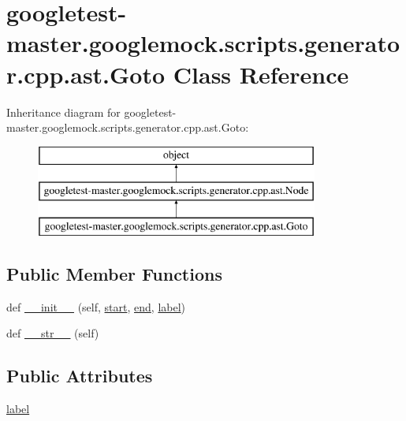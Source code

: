 \hypertarget{classgoogletest-master_1_1googlemock_1_1scripts_1_1generator_1_1cpp_1_1ast_1_1_goto}{}\section{googletest-\/master.googlemock.\+scripts.\+generator.\+cpp.\+ast.\+Goto Class Reference}
\label{classgoogletest-master_1_1googlemock_1_1scripts_1_1generator_1_1cpp_1_1ast_1_1_goto}
Inheritance diagram for googletest-\/master.googlemock.\+scripts.\+generator.\+cpp.\+ast.\+Goto\+:\begin{figure}[H]
\begin{center}
\leavevmode
\includegraphics[height=3.000000cm]{d2/d1c/classgoogletest-master_1_1googlemock_1_1scripts_1_1generator_1_1cpp_1_1ast_1_1_goto}
\end{center}
\end{figure}
\subsection*{Public Member Functions}
\begin{DoxyCompactItemize}
\item 
def \mbox{\hyperlink{classgoogletest-master_1_1googlemock_1_1scripts_1_1generator_1_1cpp_1_1ast_1_1_goto_ac2af4221e288677d8449e157f3f63fc1}{\+\_\+\+\_\+init\+\_\+\+\_\+}} (self, \mbox{\hyperlink{classgoogletest-master_1_1googlemock_1_1scripts_1_1generator_1_1cpp_1_1ast_1_1_node_a6f9eb279a989f9ca27e7d0f1975336d1}{start}}, \mbox{\hyperlink{classgoogletest-master_1_1googlemock_1_1scripts_1_1generator_1_1cpp_1_1ast_1_1_node_a747e90ade89c1764e83b5b649bde18cc}{end}}, \mbox{\hyperlink{classgoogletest-master_1_1googlemock_1_1scripts_1_1generator_1_1cpp_1_1ast_1_1_goto_a013c7dc9fce090db96490847ffdabe17}{label}})
\item 
def \mbox{\hyperlink{classgoogletest-master_1_1googlemock_1_1scripts_1_1generator_1_1cpp_1_1ast_1_1_goto_a1e7d0c7fe998d88edc7037582f0e75b0}{\+\_\+\+\_\+str\+\_\+\+\_\+}} (self)
\end{DoxyCompactItemize}
\subsection*{Public Attributes}
\begin{DoxyCompactItemize}
\item 
\mbox{\hyperlink{classgoogletest-master_1_1googlemock_1_1scripts_1_1generator_1_1cpp_1_1ast_1_1_goto_a013c7dc9fce090db96490847ffdabe17}{label}}
\end{DoxyCompactItemize}


